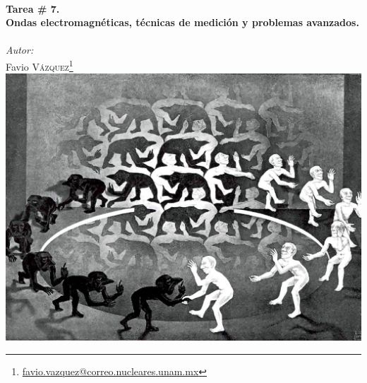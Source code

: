 \documentclass[a4paper,11pt]{article}
\numberwithin{equation}{section}
\begin{document}
\begin{titlepage}

\HRule \\[0.1cm]
{ \huge \bfseries Tarea \# 7. \\ Ondas electromagnéticas, técnicas de medición y problemas avanzados.}\\ %
\HRule \\[0.1cm]
 
\setcounter{footnote}{0}
\center
\large
\emph{Autor:} \\ %
\Large Favio \textsc{Vázquez}\footnote[1]{\href{mailto:favio.vazquez@correo.nucleares.unam.mx}{favio.vazquez@correo.nucleares.unam.mx}}
\\[0.7cm]

\includegraphics[scale=0.37]{escherEncuentro}


\vfill %

\end{titlepage}
\end{document}
